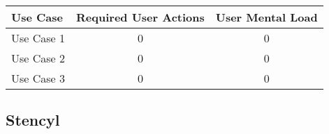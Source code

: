 


\begin{tabularx}{\textwidth}{Xcc}
\textbf{Use Case} & \textbf{Required User Actions} & \textbf{User Mental Load}\\
\hline
Use Case 1                          & {\color{red}0} & {\color{red}0} \\
Use Case 2                          & {\color{red}0} & {\color{red}0} \\
Use Case 3                          & {\color{red}0} & {\color{red}0}
\end{tabularx}

\subsection*{Stencyl}




